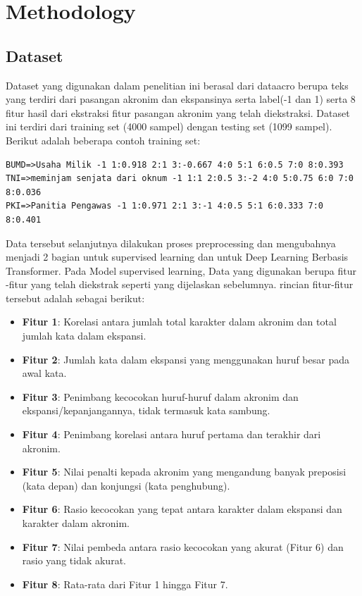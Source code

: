 \documentclass{article}\usepackage{float}
\begin{document}
\section{Methodology }

\subsection{Dataset}

Dataset yang digunakan dalam penelitian ini berasal dari dataacro \cite{ref1} berupa teks yang terdiri dari pasangan akronim dan ekspansinya serta label(-1 dan 1) serta 8 fitur hasil dari ekstraksi fitur pasangan akronim yang telah diekstraksi. Dataset ini terdiri dari training set (4000 sampel) dengan testing set (1099 sampel). Berikut adalah beberapa contoh training set:

\begin{verbatim}
BUMD=>Usaha Milik -1 1:0.918 2:1 3:-0.667 4:0 5:1 6:0.5 7:0 8:0.393
TNI=>meminjam senjata dari oknum -1 1:1 2:0.5 3:-2 4:0 5:0.75 6:0 7:0 8:0.036
PKI=>Panitia Pengawas -1 1:0.971 2:1 3:-1 4:0.5 5:1 6:0.333 7:0 8:0.401
\end{verbatim}

Data tersebut selanjutnya dilakukan proses preprocessing dan mengubahnya menjadi 2 bagian untuk supervised learning dan untuk Deep Learning Berbasis Transformer.
Pada Model supervised learning, Data yang digunakan berupa fitur -fitur yang telah diekstrak seperti yang dijelaskan sebelumnya. rincian fitur-fitur tersebut adalah sebagai berikut:

\begin{itemize}
    \item \textbf{Fitur 1}: Korelasi antara jumlah total karakter dalam akronim dan total jumlah kata dalam ekspansi.
    \item \textbf{Fitur 2}: Jumlah kata dalam ekspansi yang menggunakan huruf besar pada awal kata.
    \item \textbf{Fitur 3}: Penimbang kecocokan huruf-huruf dalam akronim dan ekspansi/kepanjangannya, tidak termasuk kata sambung.
    \item \textbf{Fitur 4}: Penimbang korelasi antara huruf pertama dan terakhir dari akronim.
    \item \textbf{Fitur 5}: Nilai penalti kepada akronim yang mengandung banyak preposisi (kata depan) dan konjungsi (kata penghubung).
    \item \textbf{Fitur 6}: Rasio kecocokan yang tepat antara karakter dalam ekspansi dan karakter dalam akronim.
    \item \textbf{Fitur 7}: Nilai pembeda antara rasio kecocokan yang akurat (Fitur 6) dan rasio yang tidak akurat.
    \item \textbf{Fitur 8}: Rata-rata dari Fitur 1 hingga Fitur 7.
\end{itemize} 
\end{document}
